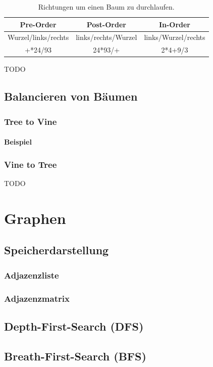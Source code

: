 \documentclass{article}
\begin{document}
\begin{table}[h!]
  \centering
  \begin{tabular}{|c|c|c|}
    \hline
    Pre-Order           & Post-Order          & In-Order            \\
    \hline
    Wurzel/links/rechts & links/rechts/Wurzel & links/Wurzel/rechts \\
    \hline
    +*24/93             & 24*93/+             & 2*4+9/3             \\
    \hline
  \end{tabular}
  \caption{Richtungen um einen Baum zu durchlaufen.}
  \label{tab:tree_traverse_orders}
\end{table}

TODO
\subsection{Balancieren von Bäumen}
\subsubsection{Tree to Vine}
\paragraph{Beispiel}
\subsubsection{Vine to Tree}


TODO
\section{Graphen}

\subsection{Speicherdarstellung}
\subsubsection{Adjazenzliste}
\subsubsection{Adjazenzmatrix}

\subsection{Depth-First-Search (DFS)}
\subsection{Breath-First-Search (BFS)}
\end{document}
